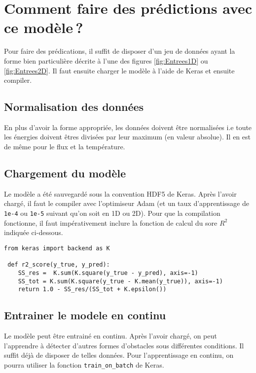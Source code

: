 

\chapter{Comment faire des prédictions avec ce modèle ?} %

\label{AppendixB} %
Pour faire des prédications, il suffit de disposer d'un jeu de données ayant la forme bien particulière décrite à l'une des figures \ref{fig:Entrees1D} ou \ref{fig:Entrees2D}. Il faut ensuite charger le modèle à l'aide de Keras et ensuite compiler.

\section{Normalisation des données}
En plus d'avoir la forme appropriée, les données doivent être normalisées i.e toute les énergies doivent êtres divisées par leur maximum (en valeur absolue). Il en est de même pour le flux et la température.

\section{Chargement du modèle}
Le modèle a été sauvegardé sous la convention HDF5 de Keras. Après l'avoir chargé, il faut le compiler avec l'optimiseur Adam (et un taux d'apprentissage de \verb|1e-4| ou \verb|1e-5| suivant qu'on soit en 1D ou 2D). Pour que la compilation fonctionne, il faut impérativement inclure la fonction de calcul du sore $R^2$ indiquée ci-dessous.

\begin{verbatim}
from keras import backend as K

 def r2_score(y_true, y_pred):
    SS_res =  K.sum(K.square(y_true - y_pred), axis=-1) 
    SS_tot = K.sum(K.square(y_true - K.mean(y_true)), axis=-1)
    return 1.0 - SS_res/(SS_tot + K.epsilon())
\end{verbatim}


\section{Entrainer le modele en continu}
Le modèle peut être entrainé en continu. Après l'avoir chargé, on peut l'apprendre à détecter d'autres formes d'obstacles sous différentes conditions. Il suffit déjà de disposer de telles données. Pour l'apprentissage en continu, on pourra utiliser la fonction \verb|train_on_batch| de Keras.

